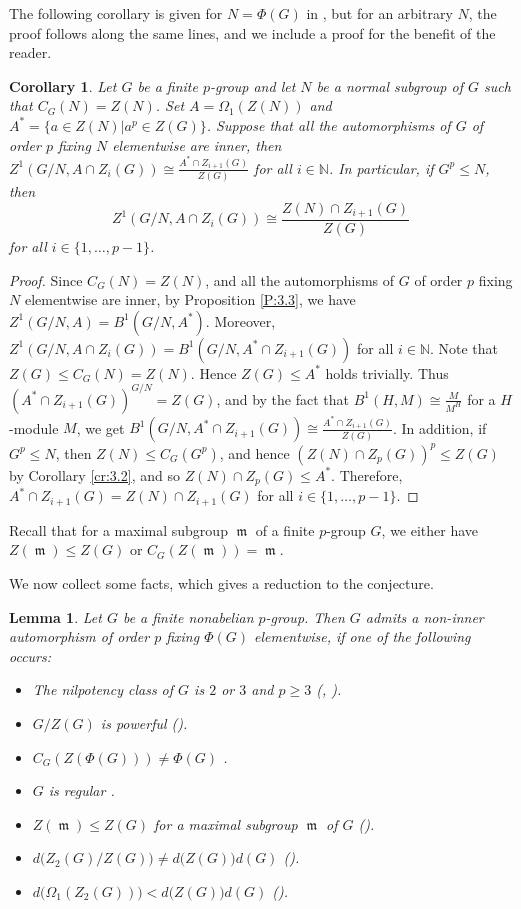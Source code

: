 \documentclass[preprint,sort&compress,12pt]{elsarticle}
\newtheorem{lemma}[theorem]{Lemma}
\newtheorem{corollary}[theorem]{Corollary}
\theoremstyle{definition}
\numberwithin{equation}{theorem}
\DeclareMathOperator{\m}{\mathfrak{m}}
\begin{document}
The following corollary is given for $N=\Phi(G)$ in \cite[Lemma 3.3]{AGW13}, but for an arbitrary $N$, the proof follows along the same lines, and we include a proof for the benefit of the reader.
\begin{corollary}\label{cr:3.4}
Let $G$ be a finite $p$-group and let $N$ be a normal subgroup of $G$ such that $C_G(N)=Z(N)$. Set $A=\Omega_1(Z(N))$ and $A^*=\{ a\in Z(N)| a^p\in Z(G)\}$. Suppose that all the automorphisms of $G$ of order $p$ fixing $N$ elementwise are inner, then $Z^1(G/N, A\cap Z_i(G)) \cong \frac{A^*\cap Z_{i+1}(G)}{Z(G)}$ for all $i\in \mathbb{N}$. In particular, if $G^p\le N$, then 
\begin{equation}\label{eq:3.4.1}
Z^1(G/N, A\cap Z_i(G))\cong \frac{Z(N)\cap Z_{i+1}(G)}{Z(G)}
\end{equation}
\noindent for all $i\in \{1, \ldots, p-1\}$.
\end{corollary}

\begin{proof}
Since $C_G(N)=Z(N)$, and all the automorphisms of $G$ of order $p$ fixing $N$ elementwise are inner, by Proposition \ref{P:3.3}, we have $Z^1(G/N, A)=B^1(G/N, A^*)$. Moreover, $Z^1(G/N, A\cap Z_i(G))= B^1(G/N, A^*\cap Z_{i+1}(G))$ for all $i\in\mathbb{N}$. Note that $Z(G)\le C_G(N)=Z(N)$. Hence $Z(G)\le A^*$ holds trivially. Thus $(A^*\cap Z_{i+1}(G))^{G/N}= Z(G)$, and by the fact that $B^1(H, M)\cong \frac{M}{M^H}$ for a $H$-module $M$, we get $B^1(G/N, A^*\cap Z_{i+1}(G))\cong \frac{A^*\cap Z_{i+1}(G)}{Z(G)}$. In addition, if $G^p\le N$, then $Z(N)\le C_G(G^p)$, and hence $(Z(N)\cap Z_p(G))^p\le Z(G)$ by Corollary \ref{cr:3.2}, and so $Z(N)\cap Z_p(G)\le A^*$. Therefore, $A^*\cap Z_{i+1}(G)= Z(N)\cap Z_{i+1}(G)$ for all $i\in \{1, \ldots, p-1\}$.
\end{proof}

Recall that for a maximal subgroup $\m$ of a finite $p$-group $G$, we either have $Z(\m)\le Z(G)$ or $C_G(Z(\m))=\m$.

We now collect some facts, which gives a reduction to the conjecture.
\begin{lemma}\label{L:3.5}
Let $G$ be a finite nonabelian $p$-group. Then $G$ admits a non-inner automorphism of order $p$ fixing $\Phi(G)$ elementwise, if one of the following occurs:
\begin{itemize}
\item [$(i)$] The nilpotency class of $G$ is $2$ or $3$ and $p\ge 3$ (\cite[Theorem 1]{LH}, \cite[Theorem\ 4.4]{AGW13}).
\item [$(ii)$] $G/Z(G)$ is powerful (\cite[Theorem\ 2.6]{A10}).
\item [$(iii)$] $C_G(Z(\Phi(G)))\neq \Phi(G)$ \cite{DS}.
\item [$(iv)$] $G$ is regular \cite{PS80, DS}.
\item [$(v)$] $Z(\m)\le Z(G)$ for a maximal subgroup $\m$ of $G$ (\cite[Lemma\ 9.108]{RJJ}).
\item [$(vii)$] $d\big(Z_2(G)/Z(G)\big)\neq d\big(Z(G)\big) d(G)$ (\cite[Corollary\ 2.3]{A10}).
\item [$(viii)$] $d\big(\Omega_1(Z_2(G))\big)< d\big(Z(G)\big) d(G)$ (\cite[Remark\ 2]{AG17}).
\end{itemize}
\end{lemma}
\end{document}

